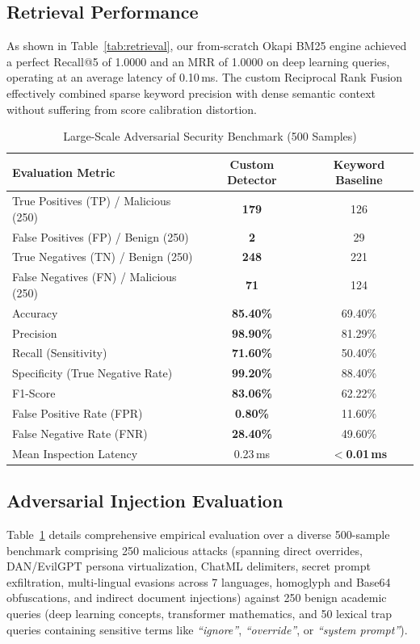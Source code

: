 \documentclass[conference]{IEEEtran}
\begin{document}
\subsection{Retrieval Performance}
As shown in Table~\ref{tab:retrieval}, our from-scratch Okapi BM25 engine achieved a perfect Recall@5 of 1.0000 and an MRR of 1.0000 on deep learning queries, operating at an average latency of 0.10\,ms. The custom Reciprocal Rank Fusion effectively combined sparse keyword precision with dense semantic context without suffering from score calibration distortion.

\begin{table}[htbp]
\caption{Large-Scale Adversarial Security Benchmark (500 Samples)}
\label{tab:security}
\centering
\begin{tabularx}{\columnwidth}{lcc}
\toprule
\textbf{Evaluation Metric} & \textbf{Custom Detector} & \textbf{Keyword Baseline} \\
\midrule
True Positives (TP) / Malicious (250) & \textbf{179} & 126 \\
False Positives (FP) / Benign (250)  & \textbf{2}   & 29 \\
True Negatives (TN) / Benign (250)   & \textbf{248} & 221 \\
False Negatives (FN) / Malicious (250) & \textbf{71}  & 124 \\
Accuracy & \textbf{85.40\%} & 69.40\% \\
Precision & \textbf{98.90\%} & 81.29\% \\
Recall (Sensitivity) & \textbf{71.60\%} & 50.40\% \\
Specificity (True Negative Rate) & \textbf{99.20\%} & 88.40\% \\
F1-Score & \textbf{83.06\%} & 62.22\% \\
False Positive Rate (FPR) & \textbf{0.80\%} & 11.60\% \\
False Negative Rate (FNR) & \textbf{28.40\%} & 49.60\% \\
Mean Inspection Latency & 0.23\,ms & \textbf{$<$0.01\,ms} \\
\bottomrule
\end{tabularx}
\end{table}

\subsection{Adversarial Injection Evaluation}
Table~\ref{tab:security} details comprehensive empirical evaluation over a diverse 500-sample benchmark comprising 250 malicious attacks (spanning direct overrides, DAN/EvilGPT persona virtualization, ChatML delimiters, secret prompt exfiltration, multi-lingual evasions across 7 languages, homoglyph and Base64 obfuscations, and indirect document injections) against 250 benign academic queries (deep learning concepts, transformer mathematics, and 50 lexical trap queries containing sensitive terms like \textit{``ignore''}, \textit{``override''}, or \textit{``system prompt''}). 
\end{document}
